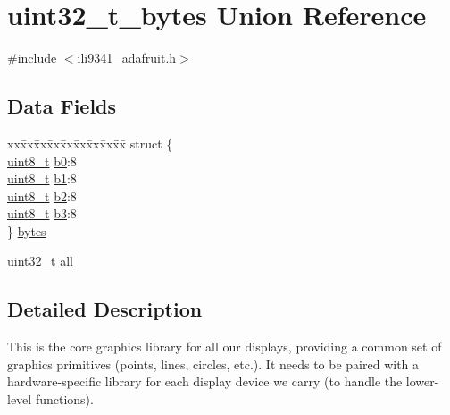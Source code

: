 \hypertarget{unionuint32__t__bytes}{\section{uint32\-\_\-t\-\_\-bytes Union Reference}
\label{unionuint32__t__bytes}
}


{\ttfamily \#include $<$ili9341\-\_\-adafruit.\-h$>$}

\subsection*{Data Fields}
\begin{DoxyCompactItemize}
\item 
\begin{tabbing}
xx\=xx\=xx\=xx\=xx\=xx\=xx\=xx\=xx\=\kill
struct \{\\
\>\hyperlink{send_8c_aba7bc1797add20fe3efdf37ced1182c5}{uint8\_t} \hyperlink{unionuint32__t__bytes_a92b86537decb69327191d870f41c60f7}{b0}:8\\
\>\hyperlink{send_8c_aba7bc1797add20fe3efdf37ced1182c5}{uint8\_t} \hyperlink{unionuint32__t__bytes_a91fb31482a2ce44b454fca964dcd556b}{b1}:8\\
\>\hyperlink{send_8c_aba7bc1797add20fe3efdf37ced1182c5}{uint8\_t} \hyperlink{unionuint32__t__bytes_a462312b99de0c6d1c497064902196e1d}{b2}:8\\
\>\hyperlink{send_8c_aba7bc1797add20fe3efdf37ced1182c5}{uint8\_t} \hyperlink{unionuint32__t__bytes_abd7739cae59fab7cf712d53f337b378a}{b3}:8\\
\} \hyperlink{unionuint32__t__bytes_a50aeebe398ee3b740421f1cc8d8583b8}{bytes}\\

\end{tabbing}\item 
\hyperlink{send_8c_a435d1572bf3f880d55459d9805097f62}{uint32\-\_\-t} \hyperlink{unionuint32__t__bytes_a83b0c87830b60d185365dbadf8efd4a0}{all}
\end{DoxyCompactItemize}


\subsection{Detailed Description}
This is the core graphics library for all our displays, providing a common set of graphics primitives (points, lines, circles, etc.). It needs to be paired with a hardware-\/specific library for each display device we carry (to handle the lower-\/level functions).

